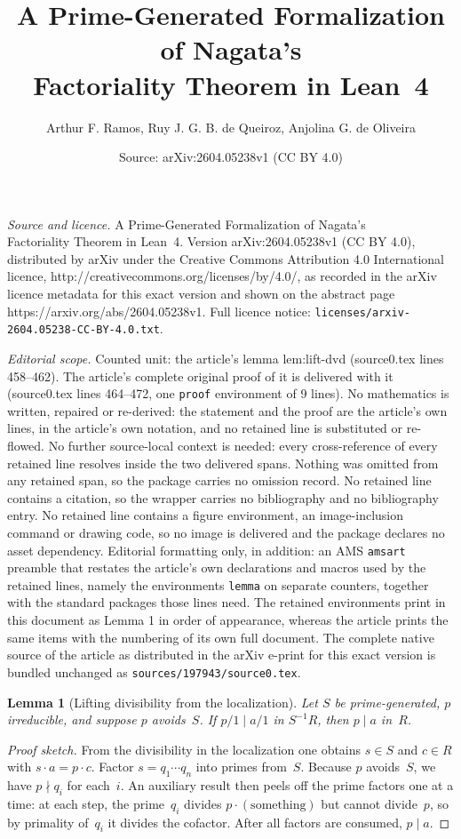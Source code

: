 \documentclass[10pt,a4paper]{amsart}
\title{A Prime-Generated Formalization of Nagata's\\ Factoriality Theorem in Lean~4}
\author{Arthur F. Ramos, Ruy J. G. B. de Queiroz, Anjolina G. de Oliveira}
\date{Source: arXiv:2604.05238v1 (CC BY 4.0)}
\newtheorem{lemma}{Lemma}
\begin{document}
\maketitle

\noindent\emph{Source and licence.} A Prime-Generated Formalization of Nagata's\\ Factoriality Theorem in Lean~4. Version arXiv:2604.05238v1 (CC BY 4.0), distributed by arXiv under the Creative Commons Attribution 4.0 International licence, http://creativecommons.org/licenses/by/4.0/, as recorded in the arXiv licence metadata for this exact version and shown on the abstract page https://arxiv.org/abs/2604.05238v1. Full licence notice: \texttt{licenses/arxiv-2604.05238-CC-BY-4.0.txt}.\par\smallskip

\noindent\textit{Editorial scope.} Counted unit: the article's lemma lem:lift-dvd (source0.tex lines 458--462). The article's complete original proof of it is delivered with it (source0.tex lines 464--472, one \texttt{proof} environment of 9 lines). No mathematics is written, repaired or re-derived: the statement and the proof are the article's own lines, in the article's own notation, and no retained line is substituted or re-flowed.  No further source-local context is needed: every cross-reference of every retained line resolves inside the two delivered spans.  Nothing was omitted from any retained span, so the package carries no omission record.  No retained line contains a citation, so the wrapper carries no bibliography and no bibliography entry.  No retained line contains a figure environment, an image-inclusion command or drawing code, so no image is delivered and the package declares no asset dependency.  Editorial formatting only, in addition: an AMS \texttt{amsart} preamble that restates the article's own declarations and macros used by the retained lines, namely the environments \texttt{lemma} on separate counters, together with the standard packages those lines need.  The retained environments print in this document as Lemma 1 in order of appearance, whereas the article prints the same items with the numbering of its own full document.  The complete native source of the article as distributed in the arXiv e-print for this exact version is bundled unchanged as \texttt{sources/197943/source0.tex}.
\begin{lemma}[Lifting divisibility from the localization]%
\label{lem:lift-dvd}
Let $S$ be prime-generated, $p$ irreducible, and suppose $p$ avoids~$S$.  If
$p/1\mid a/1$ in $S^{-1}R$, then $p\mid a$ in~$R$.
\end{lemma}

\begin{proof}[Proof sketch]
From the divisibility in the localization one obtains $s\in S$ and $c\in R$
with $s\cdot a = p\cdot c$.  Factor $s=q_1\cdots q_n$ into primes from~$S$.
Because $p$ avoids~$S$, we have $p\nmid q_i$ for each~$i$.  An auxiliary
result then peels off the prime factors one at a time: at each step, the
prime~$q_i$ divides $p\cdot(\text{something})$ but cannot divide~$p$, so by
primality of~$q_i$ it divides the cofactor.  After all factors are consumed,
$p\mid a$.
\end{proof}
\end{document}
